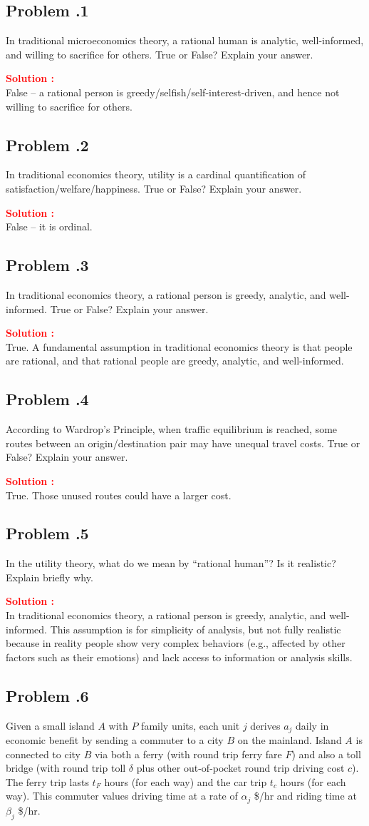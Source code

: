 \documentclass[12pt]{article}
\newcommand{\customsubsection}[1]{
  \subsection*{Problem \thesection.#1}
}
\begin{document}
\customsubsection{1}
In traditional microeconomics theory, a rational human is analytic, well-informed, and willing to sacrifice for others. True or False? Explain your answer. 


\textbf{\textcolor{red}{Solution :}} \\
False – a rational person is greedy/selfish/self-interest-driven, and hence not willing to sacrifice for others.

\newpage

\customsubsection{2}
In traditional economics theory, utility is a cardinal quantification of satisfaction/welfare/happiness. True or False? Explain your answer. 


\textbf{\textcolor{red}{Solution :}} \\
False – it is ordinal. 
\newpage

\customsubsection{3}
In traditional economics theory, a rational person is greedy, analytic, and well-informed. True or False? Explain your answer. 


\textbf{\textcolor{red}{Solution :}} \\
True. A fundamental assumption in traditional economics theory is that people are rational, and that rational people are greedy, analytic, and well-informed. 
\newpage


\customsubsection{4}
According to Wardrop’s Principle, when traffic equilibrium is reached, some routes between an origin/destination pair may have unequal travel costs. True or False? Explain your answer. 


\textbf{\textcolor{red}{Solution :}} \\
True. Those unused routes could have a larger cost.
\newpage



\customsubsection{5}
In the utility theory, what do we mean by “rational human”? Is it realistic? Explain briefly why. 


\textbf{\textcolor{red}{Solution :}} \\
In traditional economics theory, a rational person is greedy, analytic, and well-informed. This assumption is for simplicity of analysis, 
but not fully realistic because in reality people show very complex behaviors (e.g., affected by other factors such as their emotions) and lack access to information or analysis skills.
\newpage



\customsubsection{6}
Given a small island $A$ with $P$ family units, each unit $j$ derives $a_j$ daily in economic benefit by sending a commuter to a city $B$ on the mainland. Island $A$ is connected to city $B$ via both a ferry (with round trip ferry fare $F$) and also a toll bridge (with round trip toll $\delta$ plus other out-of-pocket round trip driving cost $c$). The ferry trip lasts $t_F$ hours (for each way) and the car trip $t_c$ hours (for each way). This commuter values driving time at a rate of $\alpha_j$ \$/hr and riding time at $\beta_j$ \$/hr.
\end{document}
